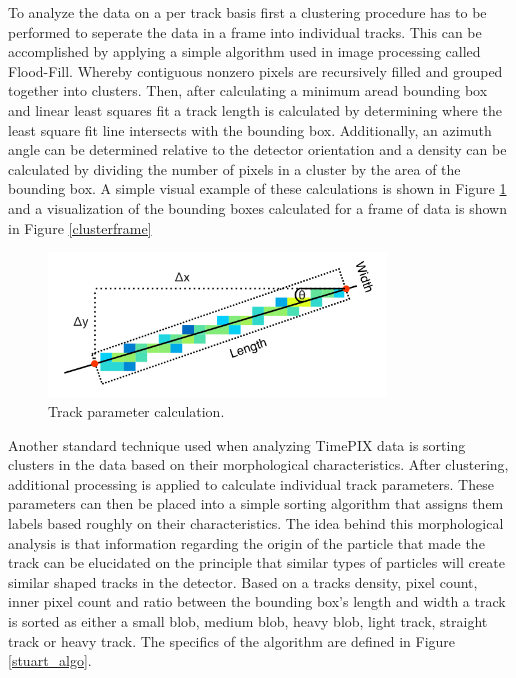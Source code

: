 To analyze the data on a per track basis first a clustering procedure has to be performed to seperate the data in a frame into individual tracks. This can be accomplished by applying a simple algorithm used in image processing called Flood-Fill. Whereby contiguous nonzero pixels are recursively filled and grouped together into clusters. Then, after calculating a minimum aread bounding box and linear least squares fit a track length is calculated by determining where the least square fit line intersects with the bounding box. Additionally, an azimuth angle can be determined relative to the detector orientation and a density can be calculated by dividing the number of pixels in a cluster by the area of the bounding box. A simple visual example of these calculations is shown in Figure \ref{track_analysis} and a visualization of the bounding boxes calculated for a frame of data is shown in Figure \ref{clusterframe}

\begin{figure}[H]
	\begin{center}
	\includegraphics[width=0.8\textwidth]{figures/density.png}
	\caption{Track parameter calculation.}
	\label{track_analysis}
	\end{center}
\end{figure}

Another standard technique used when analyzing TimePIX data is sorting clusters in the data based on their morphological characteristics. After clustering, additional processing is applied to calculate individual track parameters. These parameters can then be placed into a simple sorting algorithm that assigns them labels based roughly on their characteristics. The idea behind this morphological analysis is that information regarding the origin of the particle that made the track can be elucidated on the principle that similar types of particles will create similar shaped tracks in the detector. Based on a tracks density, pixel count, inner pixel count and ratio between the bounding box's length and width a track is sorted as either a small blob, medium blob, heavy blob, light track, straight track or heavy track. The specifics of the algorithm are defined in Figure \ref{stuart_algo}.

